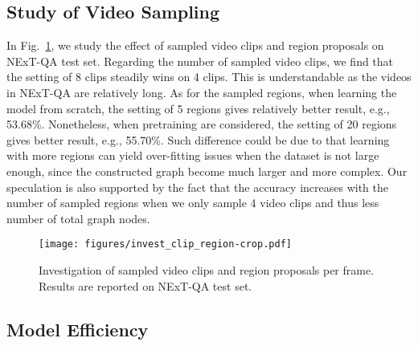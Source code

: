 \documentclass[runningheads]{llncs}
\newcommand{\eg}{e.g.}
\begin{document}
\subsection{Study of Video Sampling}
\label{app:sap}
In Fig.~\ref{fig:region}, we study the effect of sampled video clips and region proposals on NExT-QA \cite{xiao2021next} test set. Regarding the number of sampled video clips, we find that the setting of 8 clips steadily wins on 4 clips. This is understandable as the videos in NExT-QA are relatively long. As for the sampled regions, when learning the model from scratch, the setting of 5 regions gives relatively better result, \eg, 53.68\%. Nonetheless, when pretraining are considered, the setting of 20 regions gives better result, \eg, 55.70\%. Such difference could be due to that learning with more regions can yield over-fitting issues when the dataset is not large enough, since the constructed graph become much larger and more complex. Our speculation is also supported by the fact that the accuracy increases with the number of sampled regions when we only sample 4 video clips and thus less number of total graph nodes.
\begin{figure}[t!]
  \begin{center}
    \texttt{[image: figures/invest\_clip\_region-crop.pdf]}
  \end{center}
  \vspace{-0.2cm}
  \caption{Investigation of sampled video clips and region proposals per frame. Results are reported on NExT-QA test set.}
  \label{fig:region}
\end{figure}

\subsection{Model Efficiency}
\label{app:eff}
\setlength{\tabcolsep}{3pt}
\begin{table}[t!]
    \small
    \centering
    \caption{Comparison of memory and time based on NExT-QA \cite{xiao2021next}. (2m$\times$8: 2 minutes per epoch and 8 epochs in total.) 
    }
    \vspace{-0.2cm}
    \label{tab:tm}
    \vspace{-0.4cm}
\end{table}
\end{document}
